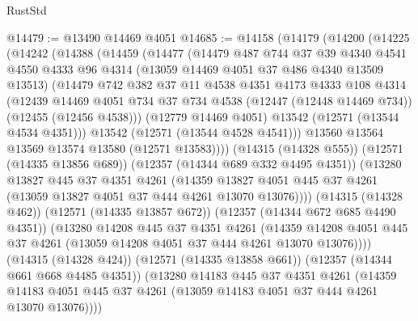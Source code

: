 \begin{lexlean}{RustStd}
\begin{coremodule}
@14479 := @13490 @14469 @4051
@14685 := @14158
    (@14179
      (@14200
        (@14225
          (@14242
            (@14388
              (@14459
                (@14477
                  (@14479
                    @487
                    @744
                    @37
                    @39
                    @4340
                    @4541
                    @4550
                    @4333
                    @96
                    @4314
                    (@13059 @14469 @4051 @37 @486 @4340 @13509 @13513)
                    (@14479
                      @742
                      @382
                      @37
                      @11
                      @4538
                      @4351
                      @4173
                      @4333
                      @108
                      @4314
                      (@12439
                        @14469
                        @4051
                        @734
                        @37
                        @734
                        @4538
                        (@12447 (@12448 @14469 @734))
                        (@12455 (@12456 @4538)))
                      (@12779 @14469 @4051)
                      @13542
                      (@12571 (@13544 @4534 @4351)))
                    @13542
                    (@12571 (@13544 @4528 @4541)))
                  @13560
                  @13564
                  @13569
                  @13574
                  @13580
                  (@12571 @13583))))
            (@14315 (@14328 @555))
            (@12571 (@14335 @13856 @689))
            (@12357 (@14344 @689 @332 @4495 @4351))
            (@13280
              @13827
              @445
              @37
              @4351
              @4261
              (@14359
                @13827
                @4051
                @445
                @37
                @4261
                (@13059 @13827 @4051 @37 @444 @4261 @13070 @13076))))
          (@14315 (@14328 @462))
          (@12571 (@14335 @13857 @672))
          (@12357 (@14344 @672 @685 @4490 @4351))
          (@13280
            @14208
            @445
            @37
            @4351
            @4261
            (@14359
              @14208
              @4051
              @445
              @37
              @4261
              (@13059 @14208 @4051 @37 @444 @4261 @13070 @13076))))
        (@14315 (@14328 @424))
        (@12571 (@14335 @13858 @661))
        (@12357 (@14344 @661 @668 @4485 @4351))
        (@13280
          @14183
          @445
          @37
          @4351
          @4261
          (@14359 @14183 @4051 @445 @37 @4261 (@13059 @14183 @4051 @37 @444 @4261 @13070 @13076))))

\end{coremodule}
\end{lexlean}
